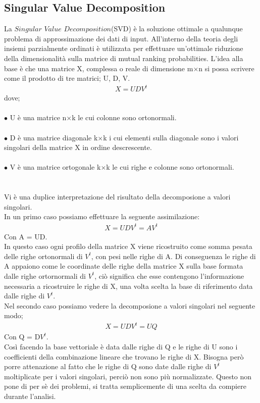 \documentclass[12pt]{article}
\begin{document}
\subsection{Singular Value Decomposition}


La $\textit{Singular Value Decomposition}$(SVD) è la soluzione ottimale a qualunque problema di approssimazione
dei dati di input. All'interno della teoria degli insiemi parzialmente ordinati è utilizzata per effettuare
un'ottimale riduzione della dimensionalità sulla matrice di mutual ranking probabilities. L'idea alla base 
è che una matrice X, complessa o reale di dimensione m$\times$n si possa scrivere come il prodotto
di tre matrici; U, D, V. 
\begin{align}
    X = UDV^t
\end{align}
dove; \\
\\
$\bullet$ U è una matrice n$\times$k le cui colonne sono ortonormali.\\
\\
$\bullet$ D è una matrice diagonale k$\times$k i cui elementi sulla diagonale sono i valori singolari della matrice X 
in ordine descrescente. \\
\\
$\bullet$ V è una matrice ortogonale k$\times$k le cui righe e colonne sono ortonormali. \\
\\
\\
Vi è una duplice interpretazione del risultato della decomposione a valori singolari. \\
In un primo caso possiamo effettuare la seguente assimilazione: 
\begin{align}
    X = UDV^t = AV^t
\end{align}
Con A = UD.\\
In questo caso ogni profilo della matrice X viene ricostruito come somma pesata delle righe 
ortonormali di $V^t$, con pesi nelle righe di A. Di conseguenza le righe di A appaiono come le coordinate 
delle righe della matrice X sulla base formata dalle righe ortornormali di $V^t$, ciò significa che 
esse contengono l'informazione necessaria a ricostruire le righe di X, una volta scelta la base di riferimento
data dalle righe di $V^t$. \\
Nel secondo caso possiamo vedere la decomposione a valori singolari nel seguente modo; 
\begin{align}
    X = UDV^t = UQ
\end{align}
Con Q = D$V^t$. \\
Così facendo la base vettoriale è data dalle righe di Q e le righe di U sono i coefficienti
della combinazione lineare che trovano le righe di X. Bisogna però porre attenazione al fatto che le 
righe di Q sono date dalle righe di $V^t$ moltiplicate per i valori singolari, perciò non sono più 
normalizzate. Questo non pone di per sè dei problemi, si tratta semplicemente di una scelta da compiere 
durante l'analisi. \\
\end{document}
